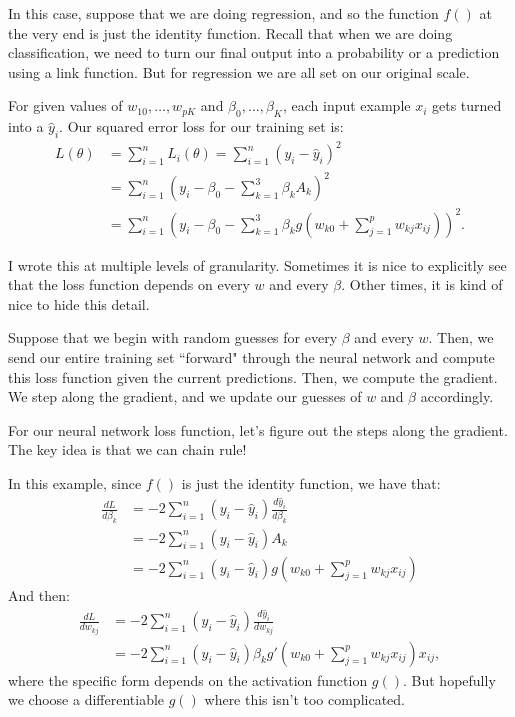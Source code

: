 In this case, suppose that we are doing regression, and so the function $f()$ at the very end is just the identity function. Recall that when we are doing classification, we need to turn our final output into a probability or a prediction using a link function. But for regression we are all set on our original scale. 

For given values of $w_{10},\ldots, w_{pK}$ and $\beta_0,\ldots, \beta_K$, each input example $x_i$ gets turned into a $\hat{y}_i$. Our squared error loss for our training set is: 
\begin{align*}
L(\theta) &= \sum_{i=1}^n L_i(\theta) = \sum_{i=1}^n (y_i - \hat{y}_i)^2 \\
&= \sum_{i=1}^n \left( y_i - \beta_0 - \sum_{k=1}^3 \beta_k A_k \right)^2 \\
&= \sum_{i=1}^n \left( y_i - \beta_0 - \sum_{k=1}^3 \beta_k g \left(w_{k0} + \sum_{j=1}^p w_{kj} x_{ij}\right)\right)^2. 
\end{align*}

I wrote this at multiple levels of granularity. Sometimes it is nice to explicitly see that the loss function depends on every $w$ and every $\beta$. Other times, it is kind of nice to hide this detail. 

Suppose that we begin with random guesses for every $\beta$ and every $w$. Then, we send our entire training set ``forward" through the neural network and compute this loss function given the current predictions. Then, we compute the gradient. We step along the gradient, and we update our guesses of $w$ and $\beta$ accordingly. 

For our neural network loss function, let's figure out the steps along the gradient. The key idea is that we can chain rule! 

In this example, since $f()$ is just the identity function, we have that:
\begin{align*}
\frac{dL}{d \beta_k} &= -2 \sum_{i=1}^n (y_i - \hat{y}_i) \frac{d\hat{y}_i}{d \beta_k} \\
&= - 2 \sum_{i=1}^n (y_i - \hat{y}_i) A_k \\
&= -2 \sum_{i=1}^n (y_i - \hat{y}_i) g \left(w_{k0} + \sum_{j=1}^p w_{kj} x_{ij}\right) 
\end{align*}
And then:
\begin{align*}
\frac{dL}{d w_{kj}} &= -2 \sum_{i=1}^n (y_i - \hat{y}_i) \frac{d\hat{y}_i}{d w_{kj}} \\
&= -2 \sum_{i=1}^n (y_i - \hat{y}_i ) \beta_{k} g' \left(w_{k0} + \sum_{j=1}^p w_{kj} x_{ij}\right) x_{ij},
\end{align*}
where the specific form depends on the activation function $g()$. But hopefully we choose a differentiable $g()$ where this isn't too complicated.

